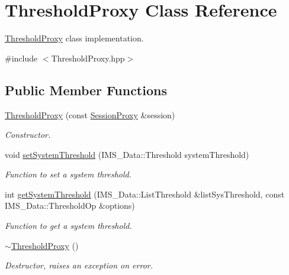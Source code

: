 \hypertarget{classThresholdProxy}{
\section{ThresholdProxy Class Reference}
\label{classThresholdProxy}
}


\hyperlink{classThresholdProxy}{ThresholdProxy} class implementation.  




{\ttfamily \#include $<$ThresholdProxy.hpp$>$}

\subsection*{Public Member Functions}
\begin{DoxyCompactItemize}
\item 
\hyperlink{classThresholdProxy_a8851fa85704fd78a21577a1a10e95487}{ThresholdProxy} (const \hyperlink{classSessionProxy}{SessionProxy} \&session)
\begin{DoxyCompactList}\small\item\em Constructor. \item\end{DoxyCompactList}\item 
void \hyperlink{classThresholdProxy_a3d1e8d6d4e1aaafd97cf75ba0e66b2c9}{setSystemThreshold} (IMS\_\-Data::Threshold systemThreshold)
\begin{DoxyCompactList}\small\item\em Function to set a system threshold. \item\end{DoxyCompactList}\item 
int \hyperlink{classThresholdProxy_a4a7f8f2ca78023a7d5f91cb6f3957e85}{getSystemThreshold} (IMS\_\-Data::ListThreshold \&listSysThreshold, const IMS\_\-Data::ThresholdOp \&options)
\begin{DoxyCompactList}\small\item\em Function to get a system threshold. \item\end{DoxyCompactList}\item 
\hypertarget{classThresholdProxy_a53ae4e6c408d7e0e8c60f3b4a8eaae3a}{
\hyperlink{classThresholdProxy_a53ae4e6c408d7e0e8c60f3b4a8eaae3a}{$\sim$ThresholdProxy} ()}
\label{classThresholdProxy_a53ae4e6c408d7e0e8c60f3b4a8eaae3a}

\begin{DoxyCompactList}\small\item\em Destructor, raises an exception on error. \item\end{DoxyCompactList}\end{DoxyCompactItemize}
